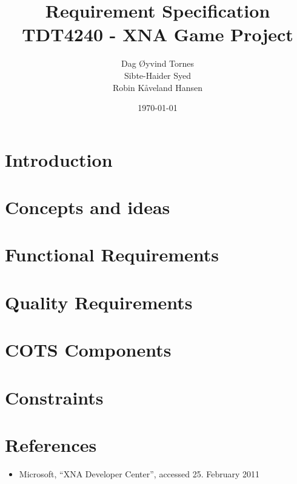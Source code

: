 \documentclass[titlepage,a4paper,11pt]{article}
\date{\today}
\begin{document}
\title{Requirement Specification\\
 		TDT4240 - XNA Game Project}

\author{Dag Øyvind Tornes\\
 		Sibte-Haider Syed\\ 
		Robin Kåveland Hansen\\}
\maketitle

\pagestyle{empty}
\tableofcontents
\clearpage
\pagestyle{plain}

\section{Introduction}


\section{Concepts and ideas}
\label{concepts}


\section{Functional Requirements}
\label{funcreq}



\section{Quality Requirements}
\label{qualreq}


\section{COTS Components}
\label{components}


\section{Constraints}
\label{constraints}


\section{References}
\begin{itemize}
  \item Microsoft, ``XNA Developer Center'', accessed 25. February 2011
\end{itemize}
\end{document}
